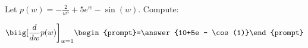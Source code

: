 \documentclass{ximera}
\author{Bart Snapp}
\begin{document}
\begin{exercise}

Let $p(w) = -\frac{2}{w^5}+5 e^w-\sin (w)$. Compute:

\[
\biig[ \frac{d}{dw}p(w) \bigg]_{w=1}
\begin{prompt}=\answer{10+5e - \cos(1)}\end{prompt}
\]
\end{exercise}
\end{document}

